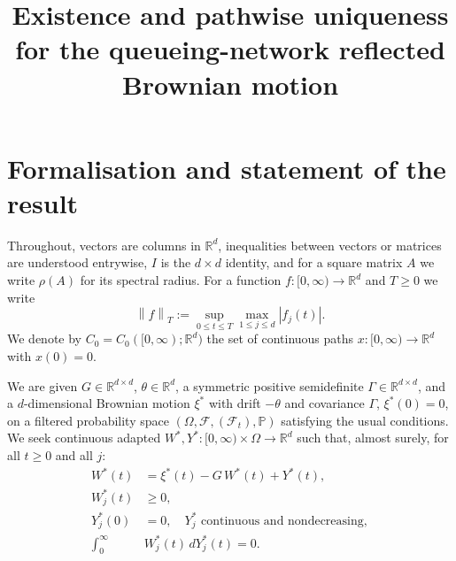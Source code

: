 \documentclass{amsart}
\theoremstyle{definition}
\theoremstyle{remark}
\newcommand{\R}{\mathbb{R}}
\newcommand{\norm}[1]{\left\lVert#1\right\rVert}
\begin{document}
\title{Existence and pathwise uniqueness for the queueing-network reflected Brownian motion}
\maketitle

\section{Formalisation and statement of the result}

Throughout, vectors are columns in $\R^d$, inequalities between vectors or
matrices are understood entrywise, $I$ is the $d\times d$ identity, and for a
square matrix $A$ we write $\rho(A)$ for its spectral radius. For a function
$f:[0,\infty)\to\R^d$ and $T\ge 0$ we write
\[
  \norm{f}_T:=\sup_{0\le t\le T}\max_{1\le j\le d}|f_j(t)|.
\]
We denote by $C_0=C_0([0,\infty);\R^d)$ the set of continuous paths
$x:[0,\infty)\to\R^d$ with $x(0)=0$.

We are given $G\in\R^{d\times d}$, $\theta\in\R^d$, a symmetric positive
semidefinite $\Gamma\in\R^{d\times d}$, and a $d$-dimensional Brownian motion
$\xi^\ast$ with drift $-\theta$ and covariance $\Gamma$, $\xi^\ast(0)=0$, on a
filtered probability space $(\Omega,\mathcal F,(\mathcal F_t),\mathbb P)$
satisfying the usual conditions. We seek continuous adapted
$W^\ast,Y^\ast:[0,\infty)\times\Omega\to\R^d$ such that, almost surely, for all
$t\ge 0$ and all $j$:
\begin{align}
  W^\ast(t)&=\xi^\ast(t)-G\,W^\ast(t)+Y^\ast(t),\label{eq:dyn}\\
  W^\ast_j(t)&\ge 0,\label{eq:pos}\\
  Y^\ast_j(0)&=0,\quad Y^\ast_j\text{ continuous and nondecreasing},\label{eq:reg}\\
  \int_0^\infty &W^\ast_j(t)\,dY^\ast_j(t)=0.\label{eq:comp}
\end{align}
\end{document}

